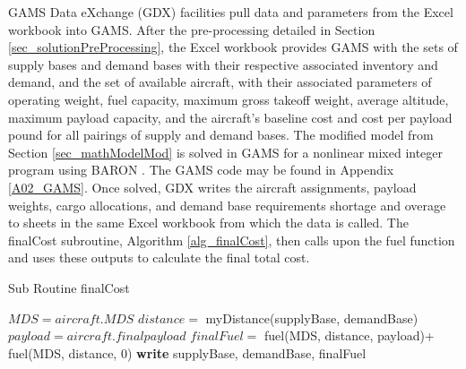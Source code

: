 GAMS Data eXchange (GDX) facilities pull data and parameters from the Excel workbook into GAMS. After the pre-processing detailed in Section \ref{sec_solutionPreProcessing}, the Excel workbook provides GAMS with the sets of supply bases and demand bases with their respective associated inventory and demand, and the set of available aircraft, with their associated parameters of operating weight, fuel capacity, maximum gross takeoff weight, average altitude, maximum payload capacity, and the aircraft's baseline cost and cost per payload pound for all pairings of supply and demand bases. The modified model from Section \ref{sec_mathModelMod} is solved in GAMS for a nonlinear mixed integer program using BARON \cite{Klnc2018ExploitingBARON}. The GAMS code may be found in Appendix \ref{A02_GAMS}. Once solved, GDX writes the aircraft assignments, payload weights, cargo allocations, and demand base requirements shortage and overage to sheets in the same Excel workbook from which the data is called.  The finalCost subroutine, Algorithm \ref{alg_finalCost}, then calls upon the fuel function and uses these outputs to calculate the final total cost. 
 \begin{algorithm}
 \caption{Sub Routine finalCost}
 \label{alg_finalCost}
 \begin{algorithmic}
        \State $MDS= aircraft.MDS$
        \State $distance=$ myDistance(supplyBase, demandBase)
        \State $payload=aircraft.finalpayload$
		\State $finalFuel=$ fuel(MDS, distance, payload)+ fuel(MDS, distance, 0)
        \State \textbf{write} supplyBase, demandBase, finalFuel 
    \EndFor
\EndFor
 \end{algorithmic}
 \end{algorithm}

